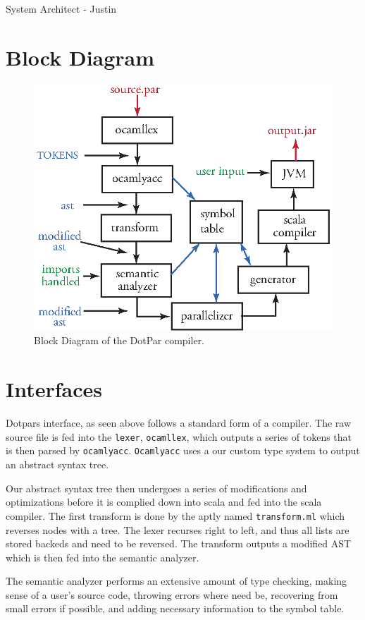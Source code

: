 System Architect - Justin
\section{Block Diagram}
\begin{figure}[H]
\centering
\includegraphics[scale=1]{blockdiagram.eps} 
\caption{Block Diagram of the DotPar compiler.}
\end{figure}

\section{Interfaces}
Dotpars interface, as seen above follows a standard form of a compiler. The raw
source file is fed into the \verb=lexer=, \verb=ocamllex=, which outputs a series of tokens that is then
parsed by \verb=ocamlyacc=.  \verb=Ocamlyacc= uses a our custom type system to output an abstract
syntax tree.

Our abstract syntax tree then undergoes a series of modifications and optimizations before it
is complied down into scala and fed into the scala compiler.  The first transform
is done by the aptly named \verb=transform.ml= which reverses nodes with a tree.  The lexer
recurses right to left, and thus all lists are stored backeds and need to be reversed.
The transform outputs a modified AST which is then fed into the semantic analyzer.

The semantic analyzer performs an extensive amount of type checking, making 
sense of a user's source code, throwing errors where need be, recovering from 
small errors if possible,  and adding necessary information to the symbol table.  

